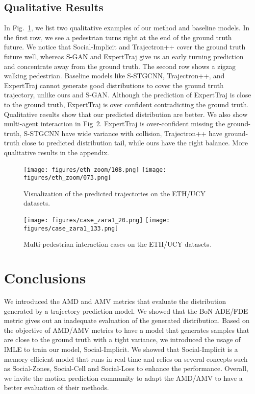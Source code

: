 \documentclass[runningheads]{llncs}
\begin{document}
\subsection{Qualitative Results}
In Fig.~\ref{fig:eth_visual}, we list two qualitative examples of our method and baseline models.
In the first row, we see a pedestrian turns right at the end of the ground truth future. 
We notice that Social-Implicit and Trajectron++ cover the ground truth future well, whereas S-GAN and ExpertTraj give us an early turning prediction and concentrate away from the ground truth. 
The second row shows a zigzag walking pedestrian. Baseline models like S-STGCNN, Trajectron++, and ExpertTraj cannot generate good distributions to cover the ground truth trajectory, unlike ours and S-GAN.
Although the prediction of ExpertTraj is close to the ground truth, ExpertTraj is over confident contradicting the ground truth. Qualitative results show that our predicted distribution are better. We also show multi-agent interaction in Fig~\ref{fig:interaction}. ExpertTraj is over-confident missing the ground-truth, S-STGCNN have wide variance with collision, Trajectron++ have ground-truth close to predicted distribution tail, while ours have the right balance. More qualitative results in the appendix. 


\begin{figure}[h]
\centering
\texttt{[image: figures/eth\_zoom/108.png]}
\centering
\texttt{[image: figures/eth\_zoom/073.png]}
\caption{Visualization of the predicted trajectories on the ETH/UCY datasets.}    
\label{fig:eth_visual}
\end{figure}

\begin{figure}[h]
\centering
\texttt{[image: figures/case\_zara1\_20.png]}
\centering
\texttt{[image: figures/case\_zara1\_133.png]}
\caption{Multi-pedestrian interaction cases on the ETH/UCY datasets.}    
\label{fig:interaction}
\end{figure}

\section{Conclusions}
We introduced the AMD and AMV metrics that evaluate the distribution generated by a trajectory prediction model. We showed that the BoN ADE/FDE metric gives out an inadequate evaluation of the generated distribution. Based on the objective of AMD/AMV metrics to have a model that generates samples that are close to the ground truth with a tight variance, we introduced the usage of IMLE to train our model, Social-Implicit. We showed that Social-Implicit is a memory efficient model that runs in real-time and relies on several concepts such as Social-Zones, Social-Cell and Social-Loss to enhance the performance. Overall, we invite the motion prediction community to adapt the AMD/AMV to have a better evaluation of their methods.
\end{document}

